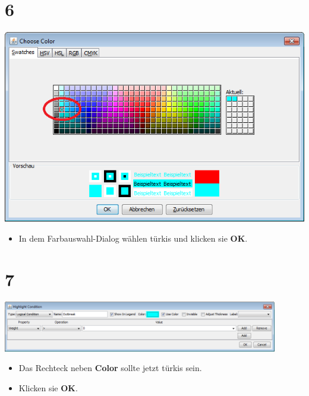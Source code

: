 \documentclass{beamer}
\begin{document}
\section{6}
\begin{frame}
	\begin{center}
  		\includegraphics[height=0.6\textheight]{6.png}
	\end{center}
	\begin{itemize}
		\item In dem Farbauswahl-Dialog wählen türkis und klicken sie \textbf{OK}.
	\end{itemize}
\end{frame}

\section{7}
\begin{frame}
	\begin{center}
  		\includegraphics[width=0.9\textwidth]{7.png}
	\end{center}
	\begin{itemize}
		\item Das Rechteck neben \textbf{Color} sollte jetzt türkis sein.
		\item Klicken sie \textbf{OK}.
	\end{itemize}
\end{frame}
\end{document}
